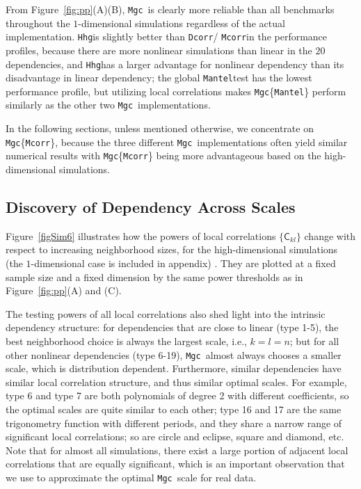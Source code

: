 \documentclass[11pt]{article}
\newcommand{\note}[2][]{\added[#1,remark={#2}]{}}
\providecommand{\sct}[1]{{\sc \texttt{#1}}}
\newcommand{\G}{\mathsf{C}}
\newcommand{\Mgc}{\sct{Mgc}}
\newcommand{\Hhg}{\sct{Hhg}}
\newcommand{\Dcorr}{\sct{Dcorr}}
\newcommand{\Mcorr}{\sct{Mcorr}}
\newcommand{\Mantel}{\sct{Mantel}}
\newcommand{\jovo}[1]{{\note{jv: #1}}}
\newcommand{\cs}[1]{{\note{cs: #1}}}
\begin{document}
From Figure~\ref{fig:pp}(A)(B), \Mgc~is clearly more reliable than all benchmarks throughout the $1$-dimensional simulations regardless of the actual implementation. \Hhg is slightly better than \Dcorr / \Mcorr in the performance profiles, because there are more nonlinear simulations than linear in the $20$ dependencies, and \Hhg has a larger advantage for nonlinear dependency than its disadvantage in linear dependency; the global \Mantel test has the lowest performance profile, but utilizing local correlations makes \Mgc\{\Mantel\} perform similarly as the other two \Mgc~implementations.

In the following sections, unless mentioned otherwise, we concentrate on \Mgc\{\Mcorr\}, because the three different \Mgc~implementations often yield similar numerical results with \Mgc\{\Mcorr\} being more advantageous based on the high-dimensional simulations.

\subsection{Discovery of Dependency Across Scales}
\label{main3}

Figure~\ref{figSim6} illustrates how the powers of local correlations $\{\G_{kl}\}$ change with respect to increasing neighborhood sizes, for the high-dimensional simulations (the $1$-dimensional case is included in appendix)\jovo{is this still true?} \cs{YES, it is still in the appendix}. They are plotted at a fixed sample size and a fixed dimension by the same power thresholds as in Figure~\ref{fig:pp}(A) and (C). 

The testing powers of all local correlations also shed light into the intrinsic dependency structure: for dependencies that are close to linear (type 1-5), the best neighborhood choice is always the largest scale, i.e., $k=l=n$; but for all other nonlinear dependencies (type 6-19), \Mgc~almost always chooses a smaller scale, which is distribution dependent. Furthermore, similar dependencies have similar local correlation structure, and thus similar optimal scales. For example, type 6 and type 7 are both polynomials of degree 2 with different coefficients, so the optimal scales are quite similar to each other; type 16 and 17 are the same trigonometry function with different periods, and they share a narrow range of significant local correlations; so are circle and eclipse, square and diamond, etc. Note that for almost all simulations, there exist a large portion of adjacent local correlations that are equally significant, which is an important observation that we use to approximate the optimal \Mgc~scale for real data.
\end{document}
